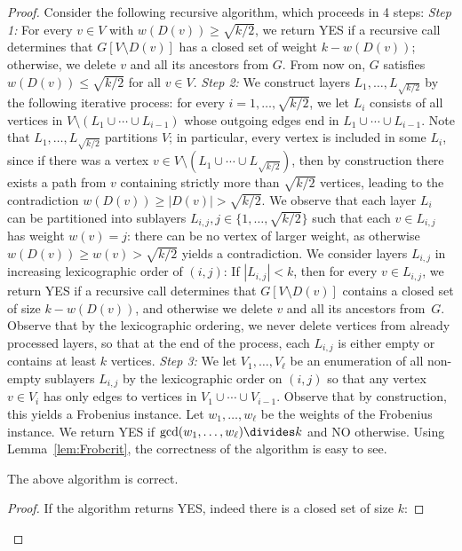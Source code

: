 \begin{proof}
Consider the following recursive algorithm, which proceeds in 4 steps:
%
\emph{Step 1:} For every $v\in V$ with $w(D(v)) \ge \sqrt{k/2}$, we return YES if a recursive call determines that $G[V \setminus D(v)]$ has a closed set of weight $k-w(D(v))$; otherwise, we delete $v$ and all its ancestors from $G$. From now on, $G$ satisfies $w(D(v)) \le \sqrt{k/2}$ for all $v\in V$.
%
\emph{Step 2:} We construct layers $L_1, \dots, L_{\sqrt{k/2}}$ by the following iterative process: for every $i=1, \dots, \sqrt{k/2}$, we let $L_i$ consists of all vertices in $V\setminus (L_1 \cup \cdots \cup L_{i-1})$ whose outgoing edges end in $L_1\cup \cdots \cup L_{i-1}$. Note that $L_1, \dots, L_{\sqrt{k/2}}$ partitions $V$; in particular, every vertex is included in some $L_i$, since if there was a vertex $v\in V\setminus (L_1 \cup \cdots \cup L_{\sqrt{k/2}})$, then by construction there exists a path from $v$ containing strictly more than $\sqrt{k/2}$ vertices, leading to the contradiction $w(D(v))\ge |D(v)| > \sqrt{k/2}$. 
%
We observe that each layer $L_i$ can be partitioned into sublayers $L_{i,j}, j\in \{1, \dots, \sqrt{k/2}\}$ such that each $v\in L_{i,j}$ has weight $w(v) = j$: there can be no vertex of larger weight, as otherwise $w(D(v)) \ge w(v) > \sqrt{k/2}$ yields a contradiction. We consider layers $L_{i,j}$ in increasing lexicographic order of $(i,j)$: If $|L_{i,j}| < k$, then for every $v\in L_{i,j}$, we return YES if a recursive call determines that $G[V\setminus D(v)]$ contains a closed set of size $k-w(D(v))$, and otherwise we delete $v$ and all its ancestors from~$G$. Observe that by the lexicographic ordering, we never delete vertices from already processed layers, so that at the end of the process, each $L_{i,j}$ is either empty or contains at least $k$ vertices. 
%
\emph{Step 3:} We let $V_1, \dots, V_\ell$ be an enumeration of all non-empty sublayers $L_{i,j}$ by the lexicographic order on $(i,j)$ so that any vertex $v\in V_{i}$ has only edges to vertices in $V_1 \cup \cdots \cup V_{i-1}$. Observe that by construction, this yields a Frobenius instance. Let $w_1,\dots, w_\ell$ be the weights of the Frobenius instance. We return YES if $\gcd(w_1,\dots, w_\ell) \divides k$ and NO otherwise. 
%
Using Lemma~\ref{lem:Frobcrit}, the correctness of the algorithm is easy to see.
%
\begin{claim}\label{cl:imp1}
The above algorithm is correct.
\end{claim}
\begin{proof}
If the algorithm returns YES, indeed there is a closed set of size $k$: 

\end{proof}
\end{proof}
